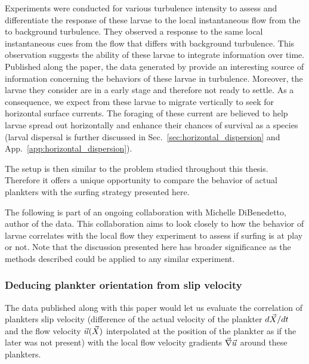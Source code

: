 Experiments were conducted for various turbulence intensity to assess and differentiate the response of these larvae to the local instantaneous flow from the to background turbulence.
They observed a response to the same local instantaneous cues from the flow that differs with background turbulence.
This observation suggests the ability of these larvae to integrate information over time.
Published along the paper, the data generated by \citet{dibenedetto2022responding} provide an interesting source of information concerning the behaviors of these larvae in turbulence.
Moreover, the larvae they consider are in a early stage and therefore not ready to settle.
As a consequence, we expect from these larvae to migrate vertically to seek for horizontal surface currents.
The foraging of these current are believed to help larvae spread out horizontally and enhance their chances of survival as a species (larval dispersal is further discussed in Sec.~\ref{sec:horizontal_dispersion} and App.~\ref{app:horizontal_dispersion}).

The setup is then similar to the problem studied throughout this thesis.
Therefore it offers a unique opportunity to compare the behavior of actual plankters with the surfing strategy presented here.

The following is part of an ongoing collaboration with Michelle DiBenedetto, author of the data.
This collaboration aims to look closely to how the behavior of larvae correlates with the local flow they experiment to assess if surfing is at play or not.
Note that the discussion presented here has broader significance as the methods described could be applied to any similar experiment.

\subsubsection{Deducing plankter orientation from slip velocity}

The data published along with this paper would let us evaluate the correlation of plankters slip velocity (difference of the actual velocity of the plankter $d \vec{X} / dt$ and the flow velocity $\vec{u}(\vec{X})$ interpolated at the position of the plankter as if the later was not present) with the local flow velocity gradients $\vec{\nabla} \vec{u}$ around these plankters.

